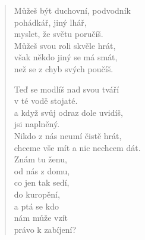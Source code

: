\begin{verse}
 Můžeš být duchovní, podvodník \\
 pohádkář, jiný lhář, \\
 myslet, že světu poručíš. \\
 Můžeš svou roli skvěle hrát, \\
 však někdo jiný se má smát, \\
 než se z chyb svých poučíš.
 
 Teď se modlíš nad svou tváří  \\
 v té vodě stojaté. \\
 a když svůj odraz dole uvidíš, \\
 jsi naplněný. \\
 Nikdo z nás neumí čistě hrát, \\
 chceme vše mít a nic nechcem dát. \\
 Znám tu ženu, \\
 od nás z domu, \\
 co jen tak sedí, \\
 do kuropění, \\
 a ptá se kdo  \\
 nám může vzít \\
 právo k zabíjení?
\end{verse}
